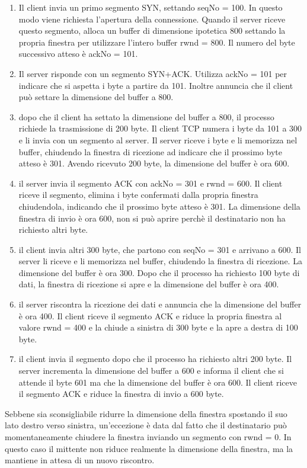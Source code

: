 \documentclass[12pt]{report}
\begin{document}
	\begin{enumerate}
		\item Il client invia un primo segmento SYN, settando seqNo = 100. In questo modo viene richiesta l'apertura della connessione. Quando il server riceve questo segmento, alloca un buffer di dimensione ipotetica 800 settando la propria finestra per utilizzare l'intero buffer rwnd = 800. Il numero del byte successivo atteso è ackNo = 101.
		\item Il server risponde con un segmento SYN+ACK. Utilizza ackNo = 101 per indicare che si aspetta i byte a partire da 101. Inoltre annuncia che il client può settare la dimensione del buffer a 800.
		\item dopo che il client ha settato la dimensione del buffer a 800, il processo richiede la trasmissione di 200 byte. Il client TCP numera i byte da 101 a 300 e li invia con un segmento al server. Il server riceve i byte e li memorizza nel buffer, chiudendo la finestra di ricezione ad indicare che il prossimo byte atteso è 301. Avendo ricevuto 200 byte, la dimensione del buffer è ora 600.
		\item il server invia il segmento ACK con ackNo = 301 e rwnd = 600. Il client riceve il segmento, elimina i byte confermati dalla propria finestra chiudendola, indicando che il prossimo byte atteso è 301. La dimensione della finestra di invio è ora 600, non si può aprire perchè il destinatario non ha richiesto altri byte.
		\item il client invia altri 300 byte, che partono con seqNo = 301 e arrivano a 600. Il server li riceve e li memorizza nel buffer, chiudendo la finestra di ricezione. La dimensione del buffer è ora 300. Dopo che il processo ha richiesto 100 byte di dati, la finestra di ricezione si apre e la dimensione del buffer è ora 400.
		\item il server riscontra la ricezione dei dati e annuncia che la dimensione del buffer è ora 400. Il client riceve il segmento ACK e riduce la propria finestra al valore rwnd = 400 e la chiude a sinistra di 300 byte e la apre a destra di 100 byte.
		\item il client invia il segmento dopo che il processo ha richiesto altri 200 byte. Il server incrementa la dimensione del buffer a 600 e informa il client che si attende il byte 601 ma che la dimensione del buffer è ora 600. Il client riceve il segmento ACK e riduce la finestra di invio a 600 byte.
	\end{enumerate}
	Sebbene sia sconsigliabile ridurre la dimensione della finestra spostando il suo lato destro verso sinistra, un'eccezione è data dal fatto che il destinatario può momentaneamente chiudere la finestra inviando un segmento con rwnd = 0. In questo caso il mittente non riduce realmente la dimensione della finestra, ma la mantiene in attesa di un nuovo riscontro.
\end{document}
